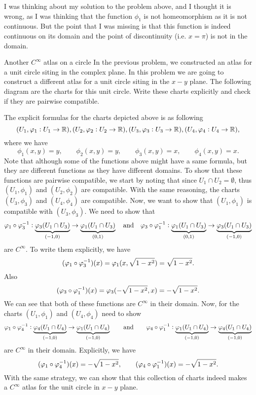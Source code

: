 \begin{observation}
	I was thinking about my solution to the problem above, and I thought it is wrong, as I was thinking that the function $ \phi_1 $ is not homeomorphism as it is not continuous. But the point that I was missing is that this function is indeed continuous on its domain and the point of discontinuity (i.e. $ x = \pi $) is not in the domain. 
\end{observation}

\begin{problem}{Another $ C^\infty $ atlas on a circle}
	In the previous problem, we constructed an atlas for a unit circle siting in the complex plane. In this problem we are going to construct a different atlas for a unit circle siting in the $ x-y $ plane. The following diagram are the charts for this unit circle. Write these charts explicitly and check if they are pairwise compatible.
	
\end{problem}
\begin{solution}
	The explicit formulas for the charts depicted above is as following
	\[ (U_1, \varphi_1:U_1\to \mathbb{R}),(U_2, \varphi_2:U_2\to \mathbb{R}), (U_3, \varphi_3:U_3\to \mathbb{R}),(U_4, \varphi_4:U_4\to \mathbb{R}), \]
	where we have
	\[ \phi_1(x,y) = y,\qquad  \phi_2(x,y) = y, \qquad \phi_3(x,y) = x, \qquad \phi_4(x,y) = x. \]
	Note that although some of the functions above might have a same formula, but they are different functions as they have different domains. To show that these functions are pairwise compatible, we start by noting that since $ U_1 \cap U_2 = \emptyset $, thus $ (U_1,\phi_1) $ and $ (U_2,\phi_2) $ are compatible. With the same reasoning, the charts $ (U_3,\phi_3) $ and $ (U_4,\phi_4) $ are compatible. Now, we want to show that $ (U_1,\phi_1) $ is compatible with $ (U_3,\phi_3) $. We need to show that 
	\[ \varphi_1 \circ \varphi_3^{-1}: \underbrace{\varphi_3(U_1\cap U_3)}_{(-1,0)} \to \underbrace{\varphi_1(U_1\cap U_3)}_{(0,1)}\quad \text{and} \quad \varphi_3\circ \varphi_1^{-1}:\underbrace{\varphi_1(U_1\cap U_3)}_{(0,1)} \to \underbrace{\varphi_3(U_1\cap  U_3)}_{(-1,0)} \]
	are $ C^\infty $. To write them explicitly, we have
	\[ (\varphi_1 \circ \varphi_3^{-1})(x) = \varphi_1(x,\sqrt{1-x^2}) = \sqrt{1-x^2}.  \]
	Also
	\[ (\varphi_3 \circ \varphi_1^{-1})(x) = \varphi_3(-\sqrt{1-x^2},x) = -\sqrt{1-x^2}. \]
	We can see that both of these functions are $ C^\infty $ in their domain. Now, for the charts $ (U_1, \phi_1) $ and $ (U_4,\phi_4) $ need to show
	\[ \varphi_1 \circ \varphi_4^{-1}:\underbrace{ \varphi_4(U_1\cap U_4)}_{(-1,0)} \to \underbrace{\varphi_1(U_1\cap U_4)}_{(-1,0)} \qquad \text{and} \qquad \varphi_4\circ \varphi_1^{-1}: \underbrace{\varphi_1(U_1\cap U_4)}_{(-1,0)} \to  \underbrace{\varphi_4(U_1\cap U_4)}_{(-1,0)} \]
	are $ C^\infty $ in their domain. Explicitly, we have
	\[ (\varphi_1 \circ \varphi_4^{-1})(x) = -\sqrt{1 -x^2}, \qquad (\varphi_4\circ \varphi_1^{-1})(x) = -\sqrt{1-x^2}.\]
	With the same strategy, we can show that this collection of charts indeed makes a $ C^\infty $ atlas for the unit circle in $ x-y $ plane.
\end{solution}


